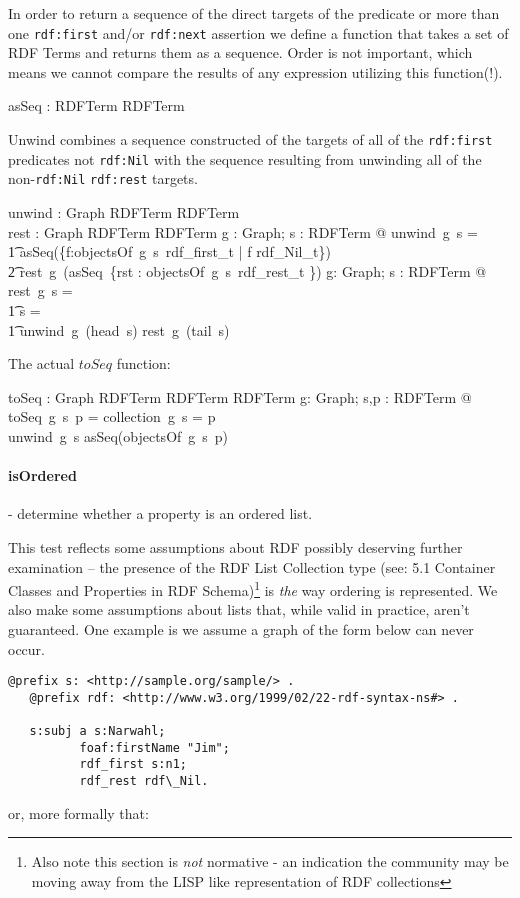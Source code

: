\documentclass{article}
\def\uri#1{{\tt #1}}
\begin{document}
In order to return a sequence of the direct targets of the predicate or more than one \uri{rdf:first} and/or \uri{rdf:next} assertion we define a function that takes a set of RDF Terms
 and returns them as a sequence.  Order is not important, which means we cannot compare the results of any expression utilizing this function(!).
\begin{gendef}
   asSeq : \power RDFTerm \fun \seq RDFTerm \\
\end{gendef}

Unwind combines a sequence constructed of the targets of all of the \uri{rdf:first} predicates not \uri{rdf:Nil} with the sequence resulting
from unwinding all of the non-\uri{rdf:Nil} \uri{rdf:rest} targets.
\begin{gendef}
    unwind : Graph \pfun RDFTerm \pfun \seq RDFTerm \\
    rest : Graph \pfun \seq RDFTerm \pfun \seq RDFTerm
\where
    \forall g : Graph; s : RDFTerm  @ unwind~g~s = \\
\t1 asSeq(\{f:objectsOf~g~s~rdf\_first\_t | f \neq rdf\_Nil\_t\}) \cat \\
\t2 rest~g~(asSeq~\{rst : objectsOf~g~s~rdf\_rest\_t \})
\also
   \forall g: Graph; s : \seq RDFTerm @ rest~g~s = \\
\t1 \IF s = \langle \rangle \THEN \langle  \rangle \\
\t1 \ELSE unwind~g~(head~s) \cat rest~g~(tail~s) 
\end{gendef}

The actual $toSeq$ function:
\begin{gendef}
   toSeq : Graph \pfun RDFTerm \pfun RDFTerm \pfun \seq RDFTerm
\where
   \forall g: Graph; s,p : RDFTerm @ toSeq~g~s~p = \IF collection~g~s = p \\
    \THEN unwind~g~s
    \ELSE asSeq(objectsOf~g~s~p)
\end{gendef}
 
\paragraph{\textbf{isOrdered}} - determine whether a property is an ordered list.

This test reflects some assumptions about RDF possibly deserving
further examination -- the presence of the RDF List Collection
type (see: 5.1 Container Classes and Properties in RDF
Schema\cite{rdfschema})\footnote{Also note this section is
  \emph{not} normative - an indication the community may be
  moving away from the LISP like representation of RDF collections} is
\emph{the} way ordering is represented.  We also make some
assumptions about lists that, while valid in practice, aren't
guaranteed.  One example is we assume a graph of the form
below can never occur.
\begin{Verbatim}[fontsize=\scriptsize, frame=single, fontseries=b]
   @prefix s: <http://sample.org/sample/> .
   @prefix rdf: <http://www.w3.org/1999/02/22-rdf-syntax-ns#> .
   
   s:subj a s:Narwahl;
          foaf:firstName "Jim";
          rdf_first s:n1;
          rdf_rest rdf\_Nil.
\end{Verbatim}
or, more formally that:
\end{document}
